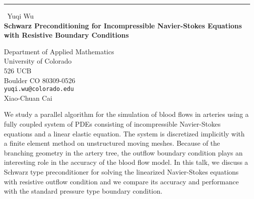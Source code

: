 \documentclass{report}
\begin{document}
\begin{center}
\rule{6in}{1pt} \
{\large Yuqi Wu \\
{\bf Schwarz Preconditioning for Incompressible Navier-Stokes Equations with Resistive Boundary Conditions}}

Department of Applied Mathematics \\ University of Colorado \\ 526 UCB \\ Boulder CO 80309-0526
\\
{\tt yuqi.wu@colorado.edu}\\
Xiao-Chuan  Cai\end{center}

We study a parallel algorithm for the simulation of blood flows in
arteries using a fully coupled system of PDEs consisting of
incompressible Navier-Stokes equations and a linear elastic equation. The
system is discretized implicitly with a finite element method on
unstructured moving meshes. Because of the branching geometry in the
artery tree, the outflow boundary condition plays an interesting role in
the accuracy of the blood flow model. In this talk, we discuss a Schwarz
type preconditioner for solving the linearized Navier-Stokes equations
with resistive outflow condition and we compare its accuracy and
performance with the standard pressure type boundary condition.
\end{document}
